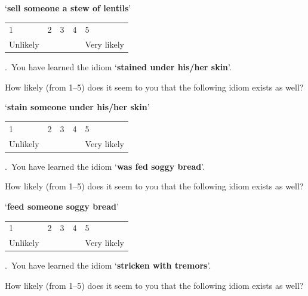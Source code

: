 \documentclass[output=paper]{langsci/langscibook}
\begin{document}
\begin{subappendices}
{\noindent \enquote*{\textbf{sell someone a stew of lentils}}\vspace{.5\baselineskip}

\noindent \begin{tabularx}{\textwidth}{XXXXX}
        1 & 2 & 3 & 4 & 5\\
        Unlikely & & & & Very likely\\
        \end{tabularx}\vspace{1\baselineskip}


.\ You have learned the idiom \enquote*{\textbf{stained under his/her
    skin}}.

\noindent How likely (from 1--5) does it seem to you that the following idiom exists
    as well?\vspace{.5\baselineskip}

\noindent \enquote*{\textbf{stain someone under his/her skin}}\vspace{.5\baselineskip}

\noindent \begin{tabularx}{\textwidth}{XXXXX}
        1 & 2 & 3 & 4 & 5\\
        Unlikely & & & & Very likely\\
        \end{tabularx}\vspace{1\baselineskip}


.\ You have learned the idiom \enquote*{\textbf{was fed soggy bread}}.

\noindent How likely (from 1--5) does it seem to you that the following idiom exists
    as well?\vspace{.5\baselineskip}

\noindent \enquote*{\textbf{feed someone soggy bread}}\vspace{.5\baselineskip}

\noindent \begin{tabularx}{\textwidth}{XXXXX}
        1 & 2 & 3 & 4 & 5\\
        Unlikely & & & & Very likely\\
        \end{tabularx}\vspace{1\baselineskip}


.\ You have learned the idiom \enquote*{\textbf{stricken with tremors}}.

\noindent How likely (from 1--5) does it seem to you that the following idiom exists
    as well?\vspace{.5\baselineskip}

}
\end{subappendices}
\end{document}
